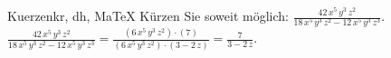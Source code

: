 \begin{MAufgabe}{Kuerzen}{kr, dh, MaTeX}
K\"urzen Sie soweit m\"oglich: $\frac{42\, x^5\, y^3\, z^2}{18\, x^5\, y^3\, z^2 - 12\, x^5\, y^3\, z^3}$.\\ 
\ifLsg\MLoesung
\quad $\frac{42\, x^5\, y^3\, z^2}{18\, x^5\, y^3\, z^2 - 12\, x^5\, y^3\, z^3}=\frac{(6\, x^5\, y^3\, z^2)\cdot(7)}{(6\, x^5\, y^3\, z^2)\cdot(3 - 2\, z)}=\frac{7}{3 - 2\, z}$.\else\relax\fi
 \end{MAufgabe}